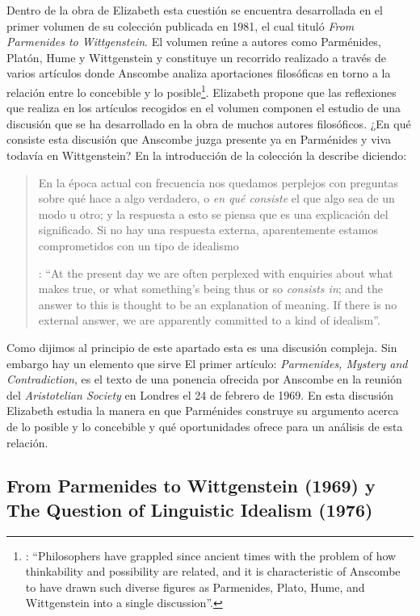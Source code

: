 Dentro de la obra de Elizabeth esta cuestión se encuentra desarrollada en el primer volumen de su colección publicada en 1981, el cual tituló \emph{From Parmenides to Wittgenstein}. El volumen reúne a autores como Parménides, Platón, Hume y Wittgenstein y constituye un recorrido realizado a través de varios artículos donde Anscombe analiza aportaciones filosóficas en torno a la relación entre lo concebible y lo posible\footnote{\cite[Cf.][193]{teichmann2008ans}: \enquote{Philosophers have grappled since ancient times with the problem of how thinkability and possibility are related, and it is characteristic of Anscombe to have drawn such diverse figures as Parmenides, Plato, Hume, and Wittgenstein into a single discussion}.}. Elizabeth propone que las reflexiones que realiza en los artículos recogidos en el volumen componen el estudio de una discusión que se ha desarrollado en la obra de muchos autores filosóficos. ¿En qué consiste esta discusión que Anscombe juzga presente ya en Parménides y viva todavía en Wittgenstein? En la introducción de la colección la describe diciendo: 
\blockquote[{\Cite[xi]{anscombe1981parmenides}}: \enquote{At the present day we are often perplexed with enquiries about what makes true, or what something's being thus or so \emph{consists in}; and the answer to this is thought to be an explanation of meaning. If there is no external answer, we are apparently committed to a kind of idealism}.]{En la época actual con frecuencia nos quedamos perplejos con preguntas sobre qué hace a algo verdadero, o \emph{en qué consiste} el que algo sea de un modo u otro; y la respuesta a esto se piensa que es una explicación del significado. Si no hay una respuesta externa, aparentemente estamos comprometidos con un tipo de idealismo}.\label{subsec:intextq}

Como dijimos al principio de este apartado esta es una discusión compleja. Sin embargo hay un elemento que sirve El primer artículo: \emph{Parmenides, Mystery and Contradiction}, es el texto de una ponencia ofrecida por Anscombe en la reunión del \emph{Aristotelian Society} en Londres el 24 de febrero de 1969. En esta discusión Elizabeth estudia la manera en que Parménides construye su argumento acerca de lo posible y lo concebible y qué oportunidades ofrece para un análisis de esta relación.

\subsection{From Parmenides to Wittgenstein (1969) y The Question of Linguistic Idealism (1976)}


